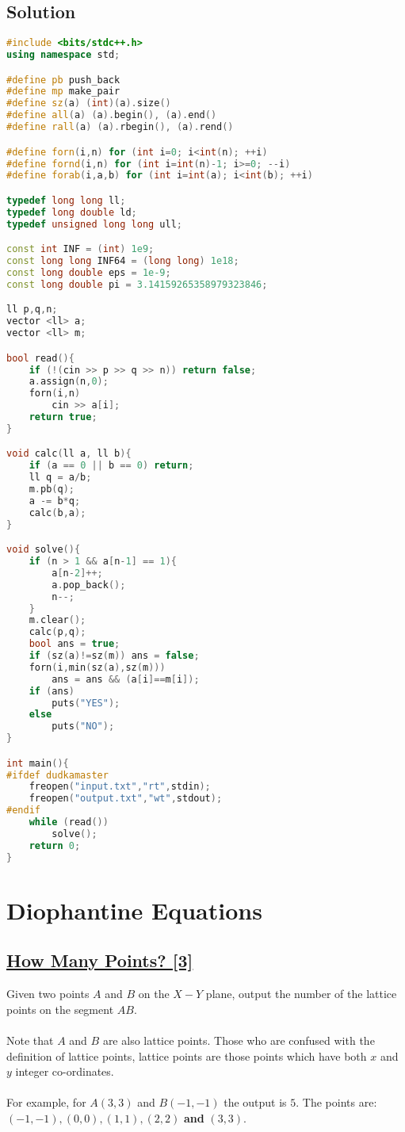 \documentclass[10pt,a4paper]{article}
\begin{document}
\begin{itemize}
\subsection*{Solution}
\begin{lstlisting}[language=C++, caption={Continued Fractions},label={1st:code}, mathescape=true, breaklines=true]
#include <bits/stdc++.h>
using namespace std;

#define pb push_back
#define mp make_pair
#define sz(a) (int)(a).size()
#define all(a) (a).begin(), (a).end()
#define rall(a) (a).rbegin(), (a).rend()

#define forn(i,n) for (int i=0; i<int(n); ++i)
#define fornd(i,n) for (int i=int(n)-1; i>=0; --i)
#define forab(i,a,b) for (int i=int(a); i<int(b); ++i)

typedef long long ll;
typedef long double ld;
typedef unsigned long long ull;

const int INF = (int) 1e9;
const long long INF64 = (long long) 1e18;
const long double eps = 1e-9;
const long double pi = 3.14159265358979323846;

ll p,q,n;
vector <ll> a;
vector <ll> m;

bool read(){
    if (!(cin >> p >> q >> n)) return false;
    a.assign(n,0);
    forn(i,n)
        cin >> a[i];
    return true;
}

void calc(ll a, ll b){
    if (a == 0 || b == 0) return;
    ll q = a/b;
    m.pb(q);
    a -= b*q;
    calc(b,a);
}

void solve(){
    if (n > 1 && a[n-1] == 1){
        a[n-2]++;
        a.pop_back();
        n--;
    }
    m.clear();
    calc(p,q);
    bool ans = true;
    if (sz(a)!=sz(m)) ans = false;
    forn(i,min(sz(a),sz(m)))
        ans = ans && (a[i]==m[i]);
    if (ans)
        puts("YES");
    else
        puts("NO");
}

int main(){
#ifdef dudkamaster
    freopen("input.txt","rt",stdin);
    freopen("output.txt","wt",stdout);
#endif
    while (read())
        solve();
    return 0;
}

\end{lstlisting}
\section{Diophantine Equations}

\subsection*{\href{https://lightoj.com/problem/how-many-points}{\underline{How Many Points? [3]}}} 
Given two points $A$ and $B$ on the $X-Y$ plane, output the number of the lattice points on the segment $AB$.
\\ \\
Note that $A$ and $B$ are also lattice points. Those who are confused with the definition of lattice points, lattice points are those points which have both $x$ and $y$ integer co-ordinates.
\\ \\
For example, for $A (3, 3)$ and $B (-1, -1)$ the output is $5$. The points are: $(-1, -1), (0, 0), (1, 1), (2, 2)$ \textbf{and} $(3, 3)$.


\end{itemize}
\end{document}
